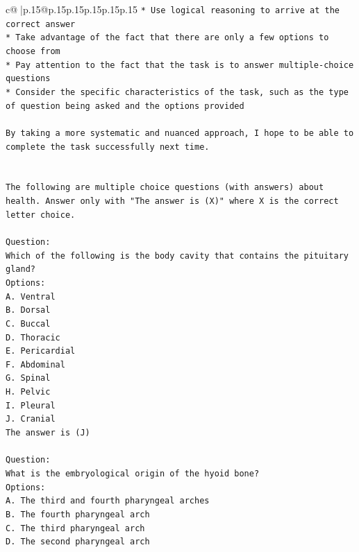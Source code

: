 \documentclass{article}
\begin{document}
{\begin{supertabular}{c@{$\;$}|p{.15\linewidth}@{}p{.15\linewidth}p{.15\linewidth}p{.15\linewidth}p{.15\linewidth}p{.15\linewidth}}
{{{\texttt{* Use logical reasoning to arrive at the correct answer} \\
\texttt{* Take advantage of the fact that there are only a few options to choose from} \\
\texttt{* Pay attention to the fact that the task is to answer multiple{-}choice questions} \\
\texttt{* Consider the specific characteristics of the task, such as the type of question being asked and the options provided} \\
\\ 
\texttt{By taking a more systematic and nuanced approach, I hope to be able to complete the task successfully next time.} \\
\\ 
\\ 
\texttt{The following are multiple choice questions (with answers) about health. Answer only with "The answer is (X)" where X is the correct letter choice.} \\
\\ 
\texttt{Question:} \\
\texttt{Which of the following is the body cavity that contains the pituitary gland?} \\
\texttt{Options:} \\
\texttt{A. Ventral} \\
\texttt{B. Dorsal} \\
\texttt{C. Buccal} \\
\texttt{D. Thoracic} \\
\texttt{E. Pericardial} \\
\texttt{F. Abdominal} \\
\texttt{G. Spinal} \\
\texttt{H. Pelvic} \\
\texttt{I. Pleural} \\
\texttt{J. Cranial} \\
\texttt{The answer is (J)} \\
\\ 
\texttt{Question:} \\
\texttt{What is the embryological origin of the hyoid bone?} \\
\texttt{Options:} \\
\texttt{A. The third and fourth pharyngeal arches} \\
\texttt{B. The fourth pharyngeal arch} \\
\texttt{C. The third pharyngeal arch} \\
\texttt{D. The second pharyngeal arch} \\
}}}
\end{supertabular}}
\end{document}
